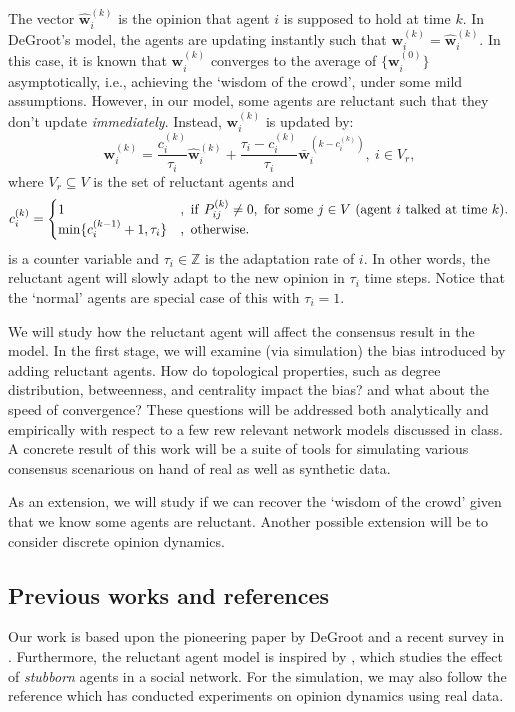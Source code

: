 \documentclass[letter]{article}
\theoremstyle{t}
\begin{document}
The vector $\hat{\bm w}_i^{(k)}$ is the opinion that agent $i$ is supposed to hold at time $k$. In DeGroot's model, the agents are updating instantly such that ${\bm w}_i^{(k)} = \hat{\bm w}_i^{(k)} $. In this case, it is known that ${\bm w}_i^{(k)}$ converges to the average of $\{{\bm w}_i^{(0)} \}$ asymptotically, i.e., achieving the `wisdom of the crowd',  under some mild assumptions. 
However, in our model, some agents are reluctant such that they don't update \emph{immediately}. Instead, ${\bm w}_i^{(k)}$ is updated by:
\[
{\bm w}_i^{(k)} = \frac{c_i^{(k)}}{\tau_i} \hat{\bm w}_i^{(k)} + \frac{\tau_i - c_i^{(k)}}{\tau_i} \bar{\bm w}_i^{(k-c_i^{(k)})},~i \in V_r,
\]
where $V_r \subseteq V$ is the set of reluctant agents and 
\[
c_i^{(k)} = \begin{cases}
1 &,~{\rm if}~P_{ij}^{(k)} \neq 0,~\text{for some}~j \in V~\text{(agent $i$ talked at time $k$)}. \\
\min\{ c_i^{(k-1)} + 1, \tau_i \} &,~{\rm otherwise}.
\end{cases}
\]
is a counter variable and $\tau_i \in \mathbb{Z}$ is the adaptation rate of $i$. In other words, the reluctant agent will slowly adapt to the new opinion in $\tau_i$ time steps. Notice that the `normal' agents are special case of this with $\tau_i = 1$. 


We will study how the reluctant agent will affect the consensus result in the model. In the first stage, we will examine (via simulation) the bias introduced by adding reluctant agents. How do topological properties, such as degree distribution, betweenness, and centrality impact the bias? and what about the speed of convergence? These questions will be addressed both analytically and empirically with respect to a few rew relevant network models discussed in class. A concrete result of this work will be a suite of tools for simulating various consensus scenarious on hand of real as well as synthetic data. 

As an extension, we will study if we can recover the `wisdom of the crowd' given that we know some agents are reluctant. Another possible extension will be to consider discrete opinion dynamics. \vspace{-.2cm}

\subsection{Previous works and references} 
Our work is based upon the pioneering paper by DeGroot \cite{Degroot_74} and a recent survey in \cite{Fagnani2014}. Furthermore, the reluctant agent model is inspired by \cite{Acemoglu2013}, which studies the effect of \emph{stubborn} agents in a social network. For the simulation, we may also follow the reference \cite{Das2014} which has conducted experiments on opinion dynamics using real data. 




\end{document}
